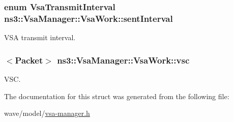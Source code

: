 \subsubsection[{\texorpdfstring{sent\+Interval}{sentInterval}}]{\setlength{\rightskip}{0pt plus 5cm}enum {\bf Vsa\+Transmit\+Interval} ns3\+::\+Vsa\+Manager\+::\+Vsa\+Work\+::sent\+Interval}\hypertarget{structns3_1_1VsaManager_1_1VsaWork_afb03c5d6cf5d60df4b143e07b9ef7728}{}\label{structns3_1_1VsaManager_1_1VsaWork_afb03c5d6cf5d60df4b143e07b9ef7728}


V\+SA transmit interval. 

\subsubsection[{\texorpdfstring{vsc}{vsc}}]{$<${\bf Packet}$>$ ns3\+::\+Vsa\+Manager\+::\+Vsa\+Work\+::vsc}\hypertarget{structns3_1_1VsaManager_1_1VsaWork_a11476a604e806a8879f946073e817b4e}{}\label{structns3_1_1VsaManager_1_1VsaWork_a11476a604e806a8879f946073e817b4e}


V\+SC. 



The documentation for this struct was generated from the following file\+:\begin{DoxyCompactItemize}
\item 
wave/model/\hyperlink{vsa-manager_8h}{vsa-\/manager.\+h}\end{DoxyCompactItemize}
